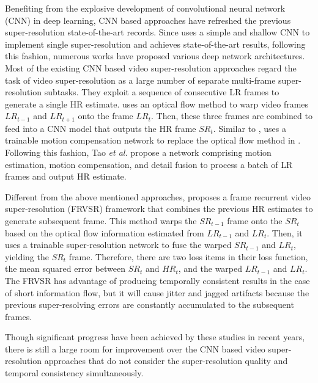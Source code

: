 \documentclass[letterpaper]{article} %
\begin{document}
Benefiting from the explosive development of convolutional neural network (CNN) in deep learning, CNN based approaches have refreshed the previous super-resolution state-of-the-art records. Since \cite{Dong2014Learning} uses a simple and shallow CNN to implement single super-resolution and achieves state-of-the-art results, following this fashion, numerous works have proposed various deep network architectures. Most of the existing CNN based video super-resolution approaches regard the task of video super-resolution as a large number of separate multi-frame super-resolution subtasks. They exploit a sequence of consecutive LR frames to generate a single HR estimate. \cite{VSRNet2016TCT} uses an optical flow method to warp video frames $LR_{t-1}$ and $LR_{t+1}$ onto the frame $LR_t$. Then, these three frames are combined to feed into a CNN model that outputs the HR frame $SR_t$. Similar to \cite{VSRNet2016TCT}, \cite{VESPCN2017cvpr} uses a trainable motion compensation network to replace the optical flow method in \cite{VSRNet2016TCT}. Following this fashion, Tao \textit{et al.} \cite{Tao2017iccv} propose a network comprising motion estimation, motion compensation, and detail fusion to process a batch of LR frames and output HR estimate.


Different from the above mentioned approaches, \cite{FRVSR2018cvpr} proposes a frame recurrent video super-resolution (FRVSR) framework that combines the previous HR estimates to generate subsequent frame. This method warps the $SR_{t-1}$ frame onto the $SR_t$ based on the optical flow information estimated from $LR_{t-1}$ and $LR_{t}$. Then, it uses a trainable super-resolution network to fuse the warped $SR_{t-1}$ and $LR_{t}$, yielding the $SR_{t}$ frame. Therefore, there are two loss items in their loss function, the mean squared error between $SR_{t}$ and $HR_{t}$, and the warped $LR_{t-1}$ and $LR_{t}$. The FRVSR has advantage of producing temporally consistent results in the case of short information flow, but it will cause jitter and jagged artifacts because the previous super-resolving errors are constantly accumulated to the subsequent frames.

Though significant progress have been achieved by these studies in recent years, there is still a large room for improvement over the CNN based video super-resolution approaches that do not consider the super-resolution quality and temporal consistency simultaneously.
\end{document}
